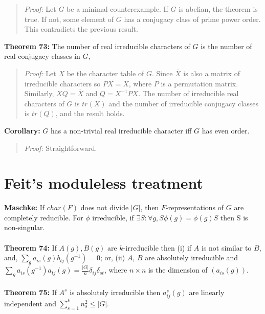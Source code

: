 {\begin{quote}
\emph{Proof:}  
Let $G$ be a minimal counterexample.  If $G$ is abelian, the theorem is true.  
If not, some element of
$G$ has a conjugacy class of prime power order.  This contradicts the previous result.
\end{quote}
{\bf Theorem 73:} The number of real irreducible characters of $G$ is the number of real conjugacy
classes in $G$,
\begin{quote}
\emph{Proof:}  
Let $X$ be the character table of $G$.  Since ${\overline X}$ is also a matrix of irreducible
characters so $P X = {\overline X}$, where $P$ is a permutation matrix.  Similarly,
$X Q = {\overline X}$ and $Q= X^{-1}PX$.  The number of irreducible real characters of $G$
is $tr(X)$ and the number of irreducible conjugacy classes is $tr(Q)$, and the result holds.
\end{quote}
{\bf Corollary:}
$G$ has a non-trivial real irreducible character iff $G$ has even order.
\begin{quote}
\emph{Proof:}  
Straightforward.
\end{quote}
\section {Feit's moduleless treatment}
{\bf Maschke:} If $char(F)$ does not divide $|G|$, then $F$-representations of $G$
are completely reducible.  For $\phi$ irreducible,
if $\exists S: \forall g, S \phi(g) = \phi(g) S$ then S is non-singular.
\\
\\
{\bf Theorem 74:}
If $A(g), B(g)$ are $k$-irreducible then (i) if $A$ is not similar to $B$,
and,
$\sum_{g} a_{is}(g) b_{tj}(g^{-1}) = 0$; or,
(ii) $A$, $B$ are absolutely irreducible and
$\sum_{g} a_{is}(g^{-1}) a_{tj}(g) =
{\frac {|G|} {n}} \delta_{ij} \delta_{st}$, where $n \times n$ is the
dimension of $(a_{is}(g))$.
\\
\\
{\bf Theorem 75:}
If $A^{s}$ is absolutely irreducible then $a^{s}_{ij}(g)$ are linearly
independent and $\sum_{s=1}^k n_{s}^{2} \leq |G|$.
}
